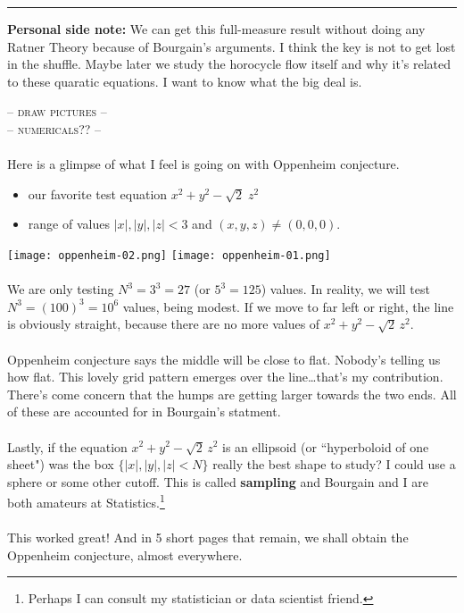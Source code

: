 \documentclass[12pt]{article}
\begin{document}
\vfill

\hrule \vspace{6pt}

\noindent \textbf{Personal side note:} We can get this full-measure result without doing any Ratner Theory because of Bourgain's arguments.  I think the key is not to get lost in the shuffle.  Maybe later we study the horocycle flow itself and why it's related to these quaratic equations.  I want to know what the big deal is.

\newpage

\noindent -- \textsc{draw pictures} -- \\ -- \textsc{numericals??} -- \\ \\
Here is a glimpse of what I feel is going on with Oppenheim conjecture. 
\begin{itemize}
\item our favorite test equation $x^2 + y^2 - \sqrt{2}\; z^2 $
\item range of values $|x|, |y|, |z| < 3$ and $(x,y,z) \neq (0,0,0)$. 
\end{itemize}

\texttt{[image: oppenheim-02.png]} \hspace{1in}
\texttt{[image: oppenheim-01.png]} \\ \\
We are only testing $N^3 = 3^3 = 27$ (or $5^3 = 125$) values.  In reality, we will test $N^3 = (100)^3 = 10^6$ values, being modest.  If we move to far left or right, the line is obviously straight, because there are no more values of $x^2 + y^2 - \sqrt{2} \, z^2$.  \\ \\
Oppenheim conjecture says the middle will be close to flat.  Nobody's telling us how flat. This lovely grid pattern emerges over the line\dots that's my contribution.  There's come concern that the humps are getting larger towards the two ends.  All of these are accounted for in Bourgain's statment. \\ \\
Lastly, if the equation $x^2 + y^2 - \sqrt{2} \, z^2$ is an ellipsoid (or ``hyperboloid of one sheet")  was the box $\{|x|, |y|, |z| < N \} $ really the best shape to study?  I could use a sphere or some other cutoff.   This is called \textbf{sampling} and Bourgain and I are both amateurs at Statistics.\footnote{Perhaps I can consult my statistician or data scientist friend.} \\ \\
This worked great!  And in 5 short pages that remain, we shall obtain the Oppenheim conjecture, almost everywhere.
\end{document}
